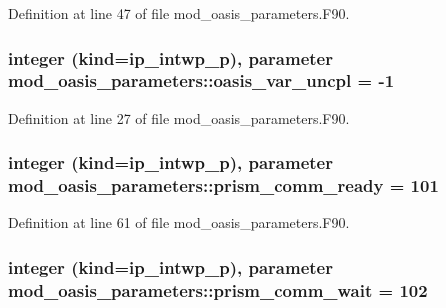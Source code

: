Definition at line 47 of file mod\+\_\+oasis\+\_\+parameters.\+F90.

\hypertarget{classmod__oasis__parameters_ac906e1466e6cdc300a0b582af6619ca5}{
\subsubsection[{oasis\+\_\+var\+\_\+uncpl}]{\setlength{\rightskip}{0pt plus 5cm}integer (kind=ip\+\_\+intwp\+\_\+p), parameter mod\+\_\+oasis\+\_\+parameters\+::oasis\+\_\+var\+\_\+uncpl = -\/1}}\label{classmod__oasis__parameters_ac906e1466e6cdc300a0b582af6619ca5}


Definition at line 27 of file mod\+\_\+oasis\+\_\+parameters.\+F90.

\hypertarget{classmod__oasis__parameters_a953f0a4738f9ca919cf5e446998cc79e}{
\subsubsection[{prism\+\_\+comm\+\_\+ready}]{\setlength{\rightskip}{0pt plus 5cm}integer (kind=ip\+\_\+intwp\+\_\+p), parameter mod\+\_\+oasis\+\_\+parameters\+::prism\+\_\+comm\+\_\+ready = 101}}\label{classmod__oasis__parameters_a953f0a4738f9ca919cf5e446998cc79e}


Definition at line 61 of file mod\+\_\+oasis\+\_\+parameters.\+F90.

\hypertarget{classmod__oasis__parameters_a3d0349d8815bf1848122d99993097842}{
\subsubsection[{prism\+\_\+comm\+\_\+wait}]{\setlength{\rightskip}{0pt plus 5cm}integer (kind=ip\+\_\+intwp\+\_\+p), parameter mod\+\_\+oasis\+\_\+parameters\+::prism\+\_\+comm\+\_\+wait = 102}}\label{classmod__oasis__parameters_a3d0349d8815bf1848122d99993097842}



